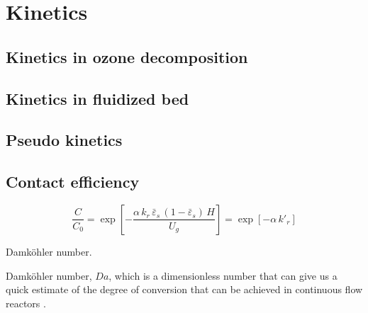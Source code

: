 \chapter{Kinetics}
\section{Kinetics in ozone decomposition}

\section{Kinetics in fluidized bed}

\section{Pseudo kinetics}

\section{Contact efficiency}

\begin{equation}
    \frac{C}{C_0} 
    = \exp\left[ 
        -\frac{\alpha\,k_r\,\bar{\varepsilon}_s\, (1-\bar{\varepsilon}_s)\,H}{U_g} 
        \right]
    = \exp\left[ -\alpha\,k'_r \right]
\end{equation}

\begin{definition}
    Damköhler number.
    
    Damköhler number, $Da$, which is a dimensionless number that can give us a quick estimate of the degree of conversion that can be achieved in continuous flow reactors \citep{fogler2016element}.
\end{definition}
